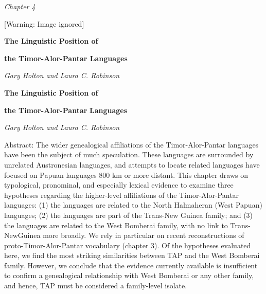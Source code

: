 \clearpage\setcounter{page}{1}\pagestyle{Standard}
{\centering
\textit{Chapter 4}
\par}

\begin{center}
 [Warning: Image ignored] %

\end{center}
{\centering
\textbf{The Linguistic Position of }
\par}

{\centering
\textbf{the Timor-Alor-Pantar Languages}
\par}

{\centering
\textit{Gary Holton and Laura C. Robinson}
\par}

\setcounter{tocdepth}{3}
\renewcommand\contentsname{}
\tableofcontents
{}

{\centering
\textbf{T}\textbf{he Linguistic Position of }
\par}

{\centering
\textbf{the Timor-Alor-Pantar }\textbf{Languages}
\par}

{\centering
\textit{Gary Holton and Laura C. Robinson}
\par}

Abstract: The wider genealogical affiliations of the Timor-Alor-Pantar languages have been the subject of much speculation. These languages are surrounded by unrelated Austronesian languages, and attempts to locate related languages have focused on Papuan languages 800 km or more distant. This chapter draws on typological, pronominal, and especially lexical evidence to examine three hypotheses regarding the higher-level affiliations of the Timor-Alor-Pantar languages: (1) the languages are related to the North Halmaheran (West Papuan) languages; (2) the languages are part of the Trans-New Guinea family; and (3) the languages are related to the West Bomberai family, with no link to Trans-NewGuinea more broadly. We rely in particular on recent reconstructions of proto-Timor-Alor-Pantar vocabulary (chapter 3). Of the hypotheses evaluated here, we find the most striking similarities between TAP and the West Bomberai family. However, we conclude that the evidence currently available is insufficient to confirm a 
genealogical relationship with West Bomberai or any other family, and hence, TAP must be considered a family-level isolate. 

